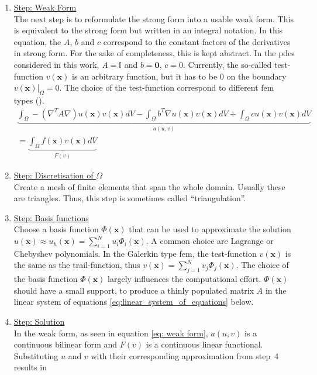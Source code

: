 \documentclass[./\jobname.tex]{subfiles}
\begin{document}
\begin{enumerate}
	\item \underline{Step: Weak Form} \\
		  The next step is to reformulate the strong form into a usable weak form. This is equivalent to the strong form but written in an integral notation. In this equation, the $A$, $b$ and $c$ correspond to the constant factors of the derivatives in strong form. For the sake of completeness, this is kept abstract. In the \gls{pde}s considered in this work, $A = \mathbb{I}$ and $b=\mathbf{0}$, $c = 0$. Currently, the so-called test-function $v(\mathbf{x})$ is an arbitrary function, but it has to be 0 on the boundary $v(\mathbf{x})|_{\Omega} = 0$. The choice of the test-function correspond to different \gls{fem} types (\cite[p. 6f]{shen_spectral_2011}).\\
		  \begin{equation}
		  \label{eq: weak form}
			  \begin{split}
			      \underbrace{\int_{\Omega} - (\nabla^T A \nabla) u(\mathbf{x}) v(\mathbf{x}) dV - \int_{\Omega} b^T \nabla u(\mathbf{x}) v(\mathbf{x}) dV + \int_{\Omega} c u(\mathbf{x}) v(\mathbf{x}) dV}_{a(u,v)} \\ = \underbrace{\int_{\Omega} f(\mathbf{x}) v(\mathbf{x}) dV}_{F(v)}
			  \end{split}
		  \end{equation} 
	\item \underline{Step: Discretisation of $\Omega$} \\
		  Create a mesh of finite elements that span the whole domain. Usually these are triangles. Thus, this step is sometimes called ``triangulation''.
	\item \underline{Step: Basis functions} \\
		  Choose a basis function $\Phi(\mathbf{x})$ that can be used to approximate the solution $u(\mathbf{x}) \approx u_{h}(\mathbf{x}) = \sum_{i = 1}^{N} u_i \Phi_i(\mathbf{x})$. A common choice are Lagrange or Chebyshev polynomials. In the Galerkin type \gls{fem}, the test-function $v(\mathbf{x})$ is the same as the trail-function, thus $v(\mathbf{x}) = \sum_{j = 1}^{N} v_j \Phi_j(\mathbf{x})$. The choice of the basis function $\Phi(\mathbf{x})$ largely influences the computational effort.  $\Phi(\mathbf{x})$ should have a small support, to produce a thinly populated matrix $A$ in the linear system of equations \eqref{eq:linear_system_of_equations} below.
	\item \underline{Step: Solution} \\
		  In the weak form, as seen in equation \eqref{eq: weak form}, $a(u,v)$ is a continuous bilinear form and $F(v)$ is a continuous linear functional. Substituting $u$ and $v$ with their corresponding approximation from \mbox{step 4} results in 

\end{enumerate}
\end{document}
